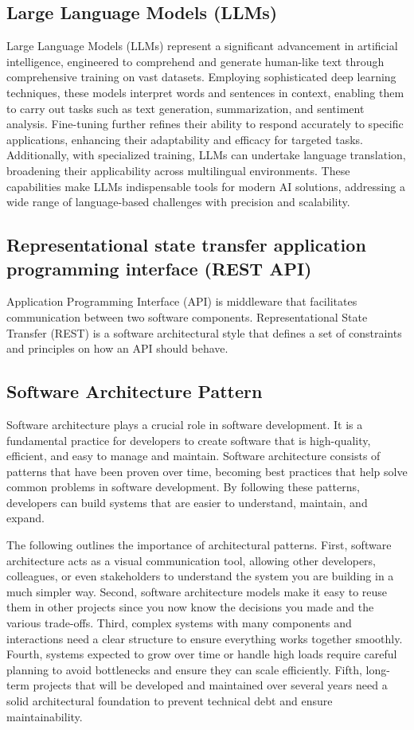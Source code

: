     \subsection{Large Language Models (LLMs)}
    Large Language Models (LLMs) represent a significant advancement in artificial intelligence, engineered to comprehend and generate human-like text through comprehensive training on vast datasets. Employing sophisticated deep learning techniques, these models interpret words and sentences in context, enabling them to carry out tasks such as text generation, summarization, and sentiment analysis. Fine-tuning further refines their ability to respond accurately to specific applications, enhancing their adaptability and efficacy for targeted tasks. Additionally, with specialized training, LLMs can undertake language translation, broadening their applicability across multilingual environments. These capabilities make LLMs indispensable tools for modern AI solutions, addressing a wide range of language-based challenges with precision and scalability.
    \subsection{Representational state transfer application programming interface (REST API)}
    Application Programming Interface (API) is middleware that facilitates communication between two software components. Representational State Transfer (REST) is a software architectural style that defines a set of constraints and principles on how an API should behave.
    \pagebreak
    \subsection{Software Architecture Pattern}
    Software architecture plays a crucial role in software development. It is a fundamental practice for developers to create software that is high-quality, efficient, and easy to manage and maintain. Software architecture consists of patterns that have been proven over time, becoming best practices that help solve common problems in software development. By following these patterns, developers can build systems that are easier to understand, maintain, and expand.
    \cite{Arslan}

    The following outlines the importance of architectural patterns. First, software architecture acts as a visual communication tool, allowing other developers, colleagues, or even stakeholders to understand the system you are building in a much simpler way. Second, software architecture models make it easy to reuse them in other projects since you now know the decisions you made and the various trade-offs. Third, complex systems with many components and interactions need a clear structure to ensure everything works together smoothly. Fourth, systems expected to grow over time or handle high loads require careful planning to avoid bottlenecks and ensure they can scale efficiently. Fifth, long-term projects that will be developed and maintained over several years need a solid architectural foundation to prevent technical debt and ensure maintainability.
    \cite{Abbas}

